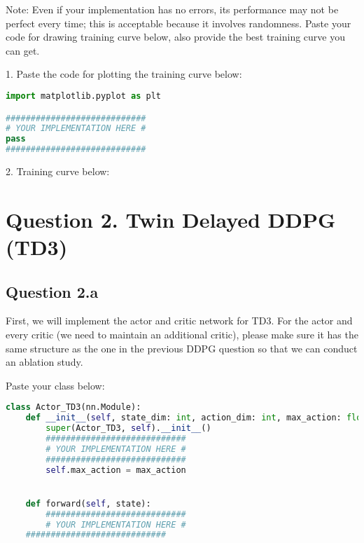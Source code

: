 \documentclass[12pt]{article}
\begin{document}
Note: Even if your implementation has no errors, its performance may not be perfect every time; this is acceptable because it involves randomness. Paste your code for drawing training curve below, also provide the best training curve you can get.
\begin{solution}
1. Paste the code for plotting the training curve below:
\begin{lstlisting}[language=Python]
import matplotlib.pyplot as plt

############################
# YOUR IMPLEMENTATION HERE #
pass
############################
\end{lstlisting}

2. Training curve below:
\end{solution}


\section*{Question 2. Twin Delayed DDPG (TD3)}

\subsection*{Question 2.a}
First, we will implement the actor and critic network for TD3. For the actor and every critic (we need to maintain an additional critic), please make sure it has the same structure as the one in the previous DDPG question so that we can conduct an ablation study.

Paste your class below:
\begin{solution}
\begin{lstlisting}[language=Python]
class Actor_TD3(nn.Module):
	def __init__(self, state_dim: int, action_dim: int, max_action: float):
		super(Actor_TD3, self).__init__()
		############################
		# YOUR IMPLEMENTATION HERE #
		############################
		self.max_action = max_action


	def forward(self, state):
		############################
		# YOUR IMPLEMENTATION HERE #
    ############################
\end{lstlisting}
\end{solution}
\end{document}
